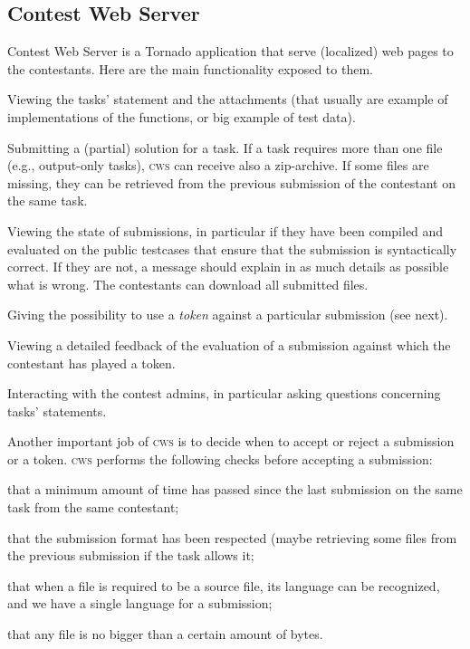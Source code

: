 \documentclass[a4paper,8pt]{amsart}
\newcommand{\CWS}{\textsc{cws}}
\newenvironment{squishlist}{%
  \begin{list}{\textbullet}%
    { \setlength{\itemsep}{0pt}%
      \setlength{\parsep}{3pt}%
      \setlength{\topsep}{3pt}%
      \setlength{\partopsep}{0pt}%
      \setlength{\leftmargin}{1.5em}%
      \setlength{\labelwidth}{1em}%
      \setlength{\labelsep}{0.5em} }%
}{\end{list}}
\begin{document}
\begin{multicols}{2}
  \subsection{Contest Web Server}

  Contest Web Server is a Tornado application that serve (localized)
  web pages to the contestants. Here are the main functionality
  exposed to them.
  \begin{squishlist}
  \item Viewing the tasks' statement and the attachments (that usually
    are example of implementations of the functions, or big example of
    test data).
  \item Submitting a (partial) solution for a task. If a task requires
    more than one file (e.g., output-only tasks), \CWS{} can receive
    also a zip-archive. If some files are missing, they can be
    retrieved from the previous submission of the contestant on the
    same task.
  \item Viewing the state of submissions, in particular if they have
    been compiled and evaluated on the public testcases that ensure
    that the submission is syntactically correct. If they are not, a
    message should explain in as much details as possible what is
    wrong. The contestants can download all submitted files.
  \item Giving the possibility to use a \emph{token\/} against a
    particular submission (see next).
  \item Viewing a detailed feedback of the evaluation of a submission
    against which the contestant has played a token.
  \item Interacting with the contest admins, in particular asking
    questions concerning tasks' statements.
  \end{squishlist}

  Another important job of \CWS{} is to decide when to accept or
  reject a submission or a token. \CWS{} performs the following checks
  before accepting a submission:
  \begin{squishlist}
  \item that a minimum amount of time has passed since the last
    submission on the same task from the same contestant;
  \item that the submission format has been respected (maybe
    retrieving some files from the previous submission if the task
    allows it;
  \item that when a file is required to be a source file, its language
    can be recognized, and we have a single language for a submission;
  \item that any file is no bigger than a certain amount of bytes.
  \end{squishlist}


\end{multicols}
\end{document}
